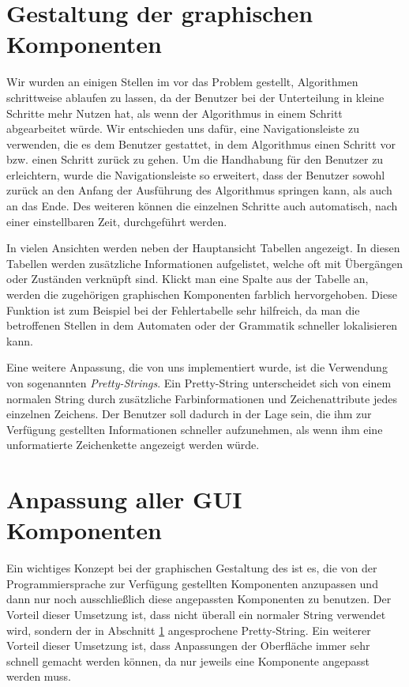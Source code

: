 \section{Gestaltung der graphischen Komponenten}\label{GUIDesign}

Wir wurden an einigen Stellen im \gtitool vor das Problem gestellt, Algorithmen
schrittweise ablaufen zu lassen, da der Benutzer bei der Unterteilung in kleine
Schritte mehr Nutzen hat, als wenn der Algorithmus in einem Schritt abgearbeitet würde.
Wir entschieden uns dafür, eine Navigationsleiste zu verwenden, die es dem
Benutzer gestattet, in dem Algorithmus einen Schritt vor bzw. einen Schritt
zurück zu gehen. Um die Handhabung für den Benutzer zu erleichtern, wurde die
Navigationsleiste so erweitert, dass der Benutzer sowohl zurück an den Anfang der
Ausführung des Algorithmus springen kann, als auch an das Ende. Des weiteren
können die einzelnen Schritte auch automatisch, nach einer einstellbaren Zeit,
durchgeführt werden.\vspace{10pt}

In vielen Ansichten werden neben der Hauptansicht Tabellen angezeigt. In
diesen Tabellen werden zusätzliche Informationen aufgelistet,
welche oft mit Übergängen oder Zuständen verknüpft sind. Klickt man
eine Spalte aus der Tabelle an, werden die zugehörigen graphischen
Komponenten farblich hervorgehoben. Diese Funktion ist zum Beispiel
bei der Fehlertabelle sehr hilfreich, da man die betroffenen
Stellen in dem Automaten oder der Grammatik schneller lokalisieren
kann.\vspace{10pt}

Eine weitere Anpassung, die von uns implementiert wurde, ist die  Verwendung von
sogenannten {\em Pretty-Strings}. Ein Pretty-String unterscheidet sich von einem
normalen String durch zu\-sätz\-liche Farbinformationen und Zeichenattribute
jedes einzelnen Zeichens. Der Benutzer soll dadurch in der Lage sein, die ihm
zur Verfügung gestellten Informationen schneller aufzunehmen, als wenn ihm eine
unformatierte Zeichenkette angezeigt werden würde.\vspace{10pt}


\section{Anpassung aller GUI Komponenten}\label{GUIAdaption}

Ein wichtiges Konzept bei der graphischen Gestaltung des \gtitool ist es, die von
der Programmiersprache zur Verfügung gestellten Komponenten anzupassen und dann
nur noch ausschließlich diese angepassten Komponenten zu benutzen. Der Vorteil
dieser Umsetzung ist, dass nicht überall ein normaler String verwendet wird,
sondern der in Abschnitt \ref{GUIDesign} angesprochene Pretty-String. Ein
weiterer Vorteil dieser Umsetzung ist, dass Anpassungen der Oberfläche immer sehr
schnell gemacht werden können, da nur jeweils eine Komponente angepasst werden
muss.\vspace{10pt}

